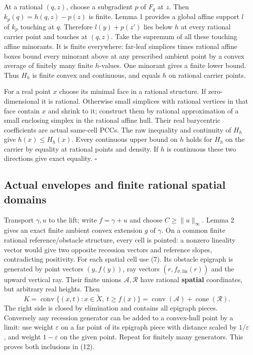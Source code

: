 \documentclass[
  11pt,
]{article}
\begin{document}
At a rational \((q,z)\), choose a subgradient \(p\) of \(F_q\) at \(z\).
Then \(k_p(q)=h(q,z)-p(z)\) is finite. Lemma 1 provides a global affine
support \(l\) of \(k_p\) touching at \(q\). Therefore \(l(y)+p(z')\)
lies below \(h\) at every rational carrier point and touches at
\((q,z)\). Take the supremum of all these touching affine minorants. It
is finite everywhere: far-leaf simplices times rational affine boxes
bound every minorant above at any prescribed ambient point by a convex
average of finitely many finite \(h\)-values. One minorant gives a
finite lower bound. Thus \(H_h\) is finite convex and continuous, and
equals \(h\) on rational carrier points.

For a real point \(x\) choose its minimal face in a rational structure.
If zero-dimensional it is rational. Otherwise small simplices with
rational vertices in that face contain \(x\) and shrink to it; construct
them by rational approximation of a small enclosing simplex in the
rational affine hull. Their real barycentric coefficients are actual
same-cell PCCs. The raw inequality and continuity of \(H_h\) give
\(h(x)\leq H_h(x)\). Every continuous upper bound on \(h\) holds for
\(H_h\) on the carrier by equality at rational points and density. If
\(h\) is continuous these two directions give exact equality.
\(\square\)

\subsection{Actual envelopes and finite rational spatial
domains}\label{actual-envelopes-and-finite-rational-spatial-domains}

Transport \(\gamma,u\) to the lift; write \(f=\gamma+u\) and choose
\(C\geq\|u\|_\infty\). Lemma 2 gives an exact finite ambient convex
extension \(g\) of \(\gamma\). On a common finite rational
reference/obstacle structure, every cell is pointed: a nonzero lineality
vector would give two opposite recession vectors and reference slopes,
contradicting positivity. For each spatial cell use (7). Its obstacle
epigraph is generated by point vectors \((y,f(y))\), ray vectors
\((r,f_{\sigma,\mathrm{lin}}(r))\) and the upward vertical ray. Their
finite unions \(\mathcal A,\mathcal R\) have rational \textbf{spatial}
coordinates, but arbitrary real heights. Then \[
K=\overline{\operatorname{conv}}\{(x,t):x\in\widetilde X,\ t\geq f(x)\}
=\operatorname{conv}(\mathcal A)+\operatorname{cone}(\mathcal R). \tag{12}
\] The right side is closed by elimination and contains all epigraph
pieces. Conversely any recession generator can be added to a convex-hull
point by a limit: use weight \(\varepsilon\) on a far point of its
epigraph piece with distance scaled by \(1/\varepsilon\), and weight
\(1-\varepsilon\) on the given point. Repeat for finitely many
generators. This proves both inclusions in (12).
\end{document}
